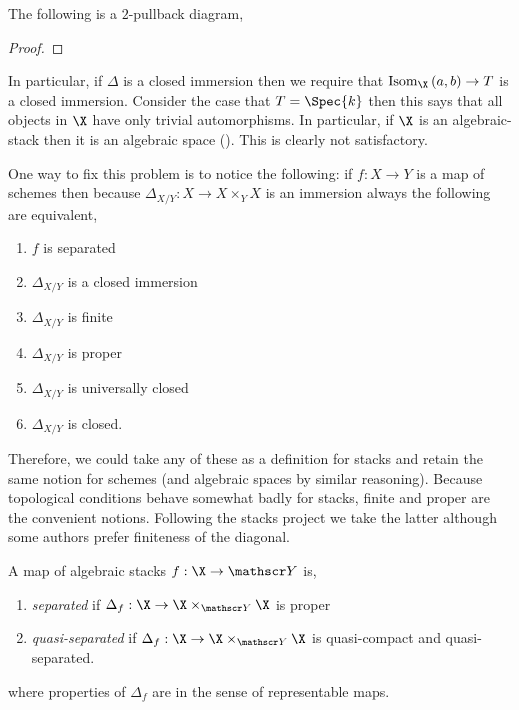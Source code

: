 \documentclass[12pt]{article}
\begin{document}
\begin{prop}
The following is a $2$-pullback diagram,
\begin{center}
\end{center}
\end{prop}

\begin{proof}

\end{proof}

\begin{rmk}
In particular, if $\Delta$ is a closed immersion then we require that $\Isom[\X]{a}{b} \to T$ is a closed immersion. Consider the case that $T = \Spec{k}$ then this says that all objects in $\X$ have only trivial automorphisms. In particular, if $\X$ is an algebraic-stack then it is an algebraic space (). This is clearly not satisfactory.
\end{rmk}

\begin{rmk}
One way to fix this problem is to notice the following: if $f : X \to Y$ is a map of schemes then because $\Delta_{X/Y} : X \to X \times_Y X$ is an immersion always the following are equivalent,
\begin{enumerate}
\item $f$ is separated
\item $\Delta_{X/Y}$ is a closed immersion
\item $\Delta_{X/Y}$ is finite
\item $\Delta_{X/Y}$ is proper
\item $\Delta_{X/Y}$ is universally closed
\item $\Delta_{X/Y}$ is closed.
\end{enumerate}
Therefore, we could take any of these as a definition for stacks and retain the same notion for schemes (and algebraic spaces by similar reasoning). Because topological conditions behave somewhat badly for stacks, finite and proper are the convenient notions. Following the stacks project we take the latter although some authors prefer finiteness of the diagonal. 
\end{rmk}

\begin{defn}
A map of algebraic stacks $f : \X \to \Y$ is,
\begin{enumerate}
\item \textit{separated} if $\Delta_f : \X \to \X \times_{\Y} \X$ is proper 
\item \textit{quasi-separated} if $\Delta_f : \X \to \X \times_{\Y} \X$ is quasi-compact and quasi-separated.
\end{enumerate}
where properties of $\Delta_f$ are in the sense of representable maps.
\end{defn}
\end{document}
